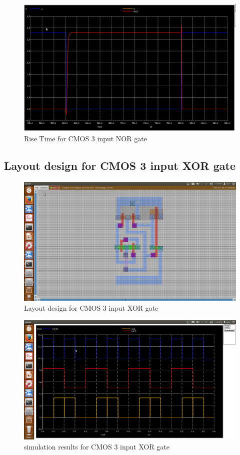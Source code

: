 \documentclass[12pt,a4paper]{article}
\begin{document}
\begin{center}
\begin{figure}[h]
\centering
\includegraphics[scale=.5]{nor_risefall_time1.jpg}
\caption[Short]{Rise Time for CMOS 3 input NOR gate}
\end{figure}
\clearpage
\subsection{Layout design for CMOS 3 input XOR gate}
\vspace{15pt}
\begin{figure}[h]
\centering
\includegraphics[scale=.34]{xor1layout.png}
\caption[Short]{Layout design for CMOS 3 input XOR gate}
\end{figure}

\begin{figure}[h]
\centering
\includegraphics[scale=.28]{xor1sim.png}
\caption[Short]{simulation results for CMOS 3 input XOR gate}
\end{figure}
\clearpage


\end{center}
\end{document}
